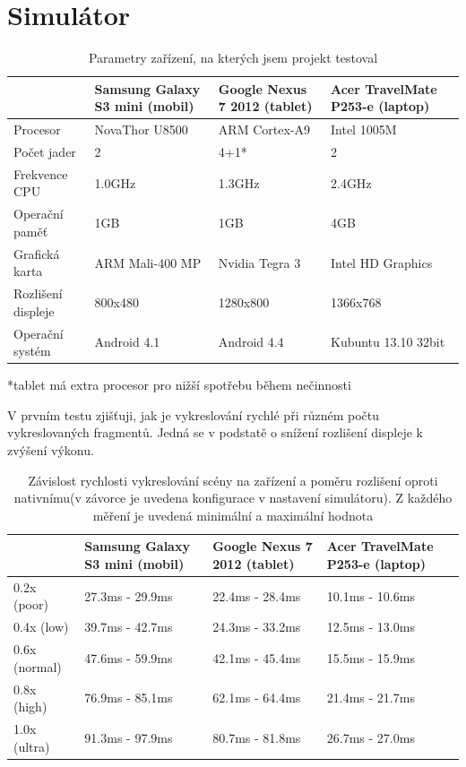 \documentclass[11pt,twoside,a4paper]{book}
\begin{document}
\section{Simulátor}

\begin{table}[h!]
\begin{center}
\begin{tabular}{|p{35mm}|p{35mm}|p{35mm}|p{35mm}|}
\hline
& \textbf{Samsung Galaxy S3 mini (mobil)} & \textbf{Google Nexus 7 2012 (tablet)} & \textbf{Acer TravelMate P253-e (laptop)} \\
\hline
Procesor & NovaThor U8500 & ARM Cortex-A9 & Intel 1005M \\ \hline
Počet jader & 2 & 4+1* & 2 \\ \hline
Frekvence CPU & 1.0GHz & 1.3GHz & 2.4GHz \\ \hline
Operační paměť & 1GB & 1GB & 4GB \\ \hline
Grafická karta & ARM Mali-400 MP & Nvidia Tegra 3 & Intel HD Graphics \\ \hline
Rozlišení displeje & 800x480 & 1280x800 & 1366x768 \\ \hline
Operační systém & Android 4.1 & Android 4.4 & Kubuntu 13.10 32bit \\ \hline
\end{tabular}
\caption{Parametry zařízení, na kterých jsem projekt testoval}
*tablet má extra procesor pro nižší spotřebu během nečinnosti
\end{center}
\end{table}

V prvním testu zjišťuji, jak je vykreslování rychlé při různém počtu vykreslovaných fragmentů. Jedná se v podstatě o snížení rozlišení displeje k zvýšení výkonu.

\begin{table}[h!]
\begin{center}
\begin{tabular}{|p{35mm}|p{35mm}|p{35mm}|p{35mm}|}
\hline
& \textbf{Samsung Galaxy S3 mini (mobil)} & \textbf{Google Nexus 7 2012 (tablet)} & \textbf{Acer TravelMate P253-e (laptop)} \\
\hline
0.2x (poor) & 27.3ms - 29.9ms & 22.4ms - 28.4ms & 10.1ms - 10.6ms \\ \hline
0.4x (low) & 39.7ms - 42.7ms & 24.3ms - 33.2ms & 12.5ms - 13.0ms \\ \hline
0.6x (normal) & 47.6ms - 59.9ms & 42.1ms - 45.4ms & 15.5ms - 15.9ms \\ \hline
0.8x (high) & 76.9ms - 85.1ms & 62.1ms - 64.4ms & 21.4ms - 21.7ms \\ \hline
1.0x (ultra) & 91.3ms - 97.9ms & 80.7ms - 81.8ms & 26.7ms - 27.0ms \\ \hline
\end{tabular}
\caption{Závislost rychlosti vykreslování scény na zařízení a poměru rozlišení oproti nativnímu(v závorce je uvedena konfigurace v nastavení simulátoru). Z každého měření je uvedená minimální a maximální hodnota}
\end{center}
\end{table}
\pagebreak
\end{document}
